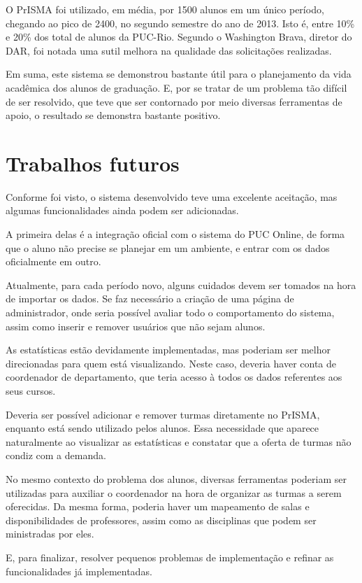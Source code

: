 \documentclass[graduacao,brazil]{ThesisPUC}
\begin{document}
O PrISMA foi utilizado, em média, por 1500 alunos em um único período, chegando ao pico de 2400, no segundo semestre do ano de 2013. Isto é, entre 10\% e 20\% dos total de alunos da PUC-Rio. Segundo o Washington Brava, diretor do DAR, foi notada uma sutil melhora na qualidade das solicitações realizadas.

Em suma, este sistema se demonstrou bastante útil para o planejamento da vida acadêmica dos alunos de graduação. E, por se tratar de um problema tão difícil de ser resolvido, que teve que ser contornado por meio diversas ferramentas de apoio, o resultado se demonstra bastante positivo.


\chapter{Trabalhos futuros}

Conforme foi visto, o sistema desenvolvido teve uma excelente aceitação, mas algumas funcionalidades ainda podem ser adicionadas.

A primeira delas é a integração oficial com o sistema do PUC Online, de forma que o aluno não precise se planejar em um ambiente, e entrar com os dados oficialmente em outro.

Atualmente, para cada período novo, alguns cuidados devem ser tomados na hora de importar os dados. Se faz necessário a criação de uma página de administrador, onde seria possível avaliar todo o comportamento do sistema, assim como inserir e remover usuários que não sejam alunos.

As estatísticas estão devidamente implementadas, mas poderiam ser melhor direcionadas para quem está visualizando. Neste caso, deveria haver conta de coordenador de departamento, que teria acesso à todos os dados referentes aos seus cursos.

Deveria ser possível adicionar e remover turmas diretamente no PrISMA, enquanto está sendo utilizado pelos alunos. Essa necessidade que aparece naturalmente ao visualizar as estatísticas e constatar que a oferta de turmas não condiz com a demanda.

No mesmo contexto do problema dos alunos, diversas ferramentas poderiam ser utilizadas para auxiliar o coordenador na hora de organizar as turmas a serem oferecidas. Da mesma forma, poderia haver um mapeamento de salas e disponibilidades de professores, assim como as disciplinas que podem ser ministradas por eles.

E, para finalizar, resolver pequenos problemas de implementação e refinar as funcionalidades já implementadas.

\arial
\nocite{*}


\normalfont

% 
\end{document}
